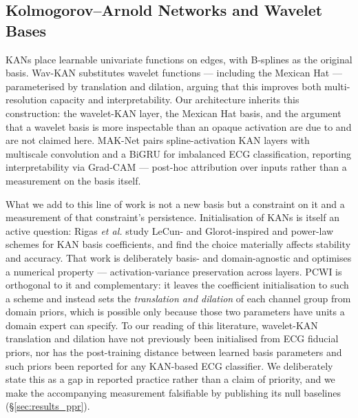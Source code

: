 \documentclass[journal,twoside,web]{ieeecolor}
\begin{document}
\subsection{Kolmogorov--Arnold Networks and Wavelet Bases}
KANs \cite{liu_kan_2024} place learnable univariate functions on edges, with B-splines as the original basis. Wav-KAN \cite{bozorgasl_wavkan_2024} substitutes wavelet functions --- including the Mexican Hat --- parameterised by translation and dilation, arguing that this improves both multi-resolution capacity and interpretability. Our architecture inherits this construction: the wavelet-KAN layer, the Mexican Hat basis, and the argument that a wavelet basis is more inspectable than an opaque activation are due to \cite{bozorgasl_wavkan_2024, liu_kan_2024} and are not claimed here. MAK-Net \cite{zhao_mak-net_2025} pairs spline-activation KAN layers with multiscale convolution and a BiGRU for imbalanced ECG classification, reporting interpretability via Grad-CAM --- post-hoc attribution over inputs rather than a measurement on the basis itself.

What we add to this line of work is not a new basis but a constraint on it and a measurement of that constraint's persistence. Initialisation of KANs is itself an active question: Rigas \emph{et al.} \cite{rigas_initialization_2025} study LeCun- and Glorot-inspired and power-law schemes for KAN basis coefficients, and find the choice materially affects stability and accuracy. That work is deliberately basis- and domain-agnostic and optimises a numerical property --- activation-variance preservation across layers. PCWI is orthogonal to it and complementary: it leaves the coefficient initialisation to such a scheme and instead sets the \emph{translation and dilation} of each channel group from domain priors, which is possible only because those two parameters have units a domain expert can specify. To our reading of this literature, wavelet-KAN translation and dilation have not previously been initialised from ECG fiducial priors, nor has the post-training distance between learned basis parameters and such priors been reported for any KAN-based ECG classifier. We deliberately state this as a gap in reported practice rather than a claim of priority, and we make the accompanying measurement falsifiable by publishing its null baselines (\S\ref{sec:results_ppr}).
\end{document}
